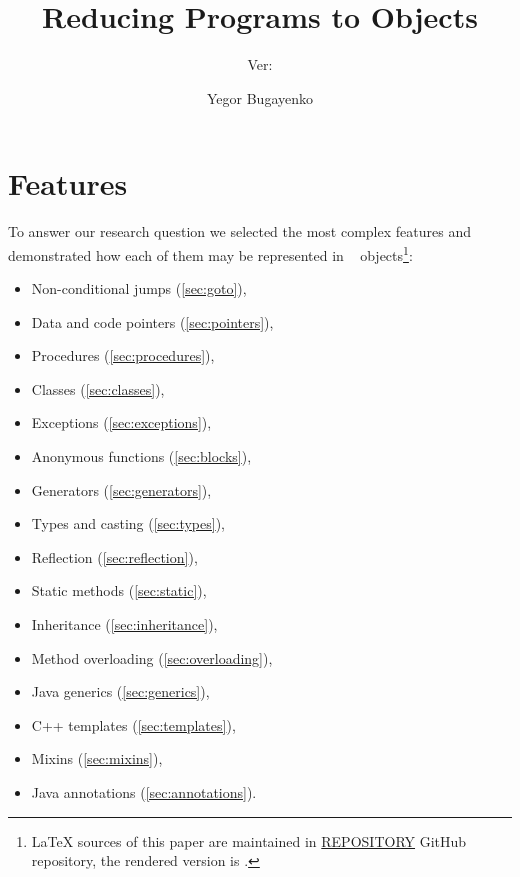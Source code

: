 \documentclass[sigplan,nonacm]{acmart}
\title{Reducing Programs to Objects}
\subtitle{
  Ver:
  \texorpdfstring{
    \href{https://github.com/REPOSITORY/releases/tag/0.0.0}
      {\ff{0.0.0}}
  }{0.0.0}
}
\author{Yegor Bugayenko}
\affiliation{\institution{Huawei}\country{Russia}\city{Moscow}}
\begin{document}
\raggedbottom

\maketitle

\section{Features}

To answer our research question we selected the most complex features and demonstrated how each of them may be represented in \eolang{}~\citep{bugayenko2021eolang} objects\footnote{%
\LaTeX{} sources of this paper are maintained in
\href{https://github.com/REPOSITORY}{REPOSITORY} GitHub repository,
the rendered version is \href{https://github.com/REPOSITORY/releases/tag/0.0.0}{}.}:

\begin{itemize}
    \item Non-conditional jumps
      (\cref{sec:goto}),
    \item Data and code pointers
      (\cref{sec:pointers}),
    \item Procedures
      (\cref{sec:procedures}),
    \item Classes
        (\cref{sec:classes}),
    \item Exceptions
        (\cref{sec:exceptions}),
    \item Anonymous functions
        (\cref{sec:blocks}),
    \item Generators
        (\cref{sec:generators}),
    \item Types and casting
        (\cref{sec:types}),
    \item Reflection
        (\cref{sec:reflection}),
    \item Static methods
        (\cref{sec:static}),
    \item Inheritance
        (\cref{sec:inheritance}),
    \item Method overloading
        (\cref{sec:overloading}),
    \item Java generics
        (\cref{sec:generics}),
    \item C++ templates
        (\cref{sec:templates}),
    \item Mixins
        (\cref{sec:mixins}),
    \item Java annotations
        (\cref{sec:annotations}).
\end{itemize}
\end{document}
